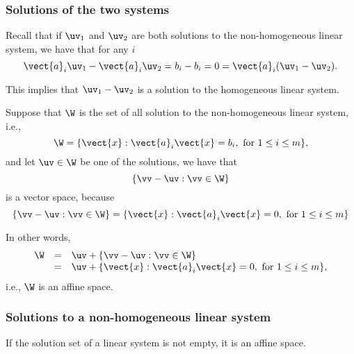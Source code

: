 \begin{frame}
  \frametitle{Solutions of the two systems}

  Recall that if $\uv_1$ and $\uv_2$ are both solutions to the
  non-homogeneous linear system, we have that for any $i$
  \[
  \vect{a}_i \uv_1 - \vect{a}_i \uv_2
  = b_i - b_i = 0 = \vect{a}_i (\uv_1 - \uv_2).
  \]
  \pause

  This implies that $\uv_1-\uv_2$ is a solution to the homogeneous
  linear system.
\end{frame}

\begin{frame}
  Suppose that $\W$ is the set of all solution to the non-homogeneous
  linear system, i.e.,
  \[
  \W = \{\vect{x} : \vect{a}_i\vect{x} = b_i, \ \mbox{for $1\leq i\leq m$}\},
  \]
  and let $\uv\in \W$ be one of the solutions, we have that
  \[
  \{\vv - \uv : \vv\in\W \} 
  \]
  \pause
  is a vector space, because
  \pause
  \[
  \{\vv - \uv : \vv\in\W \}
  =
  \{\vect{x} : \vect{a}_i\vect{x} = 0, \ \mbox{for $1\leq i\leq m$}\}
  \]

  \vspace{0.1in}
  \pause

  In other words,
  \[
  \begin{array}{rcl}
    \W &=& \uv + \{\vv - \uv : \vv\in\W \}  \\
    &=& \uv + \{\vect{x} : \vect{a}_i\vect{x} = 0, \ \mbox{for $1\leq i\leq m$}\},
  \end{array}
  \]
  \pause
  i.e., $\W$ is an affine space.
\end{frame}

\begin{frame}
  \frametitle{Solutions to a non-homogeneous linear system}

  \begin{lemma}
    If the solution set of a linear system is not empty, it is an
    affine space.
  \end{lemma}
\end{frame}
